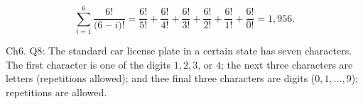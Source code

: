 \documentclass[12pt]{article}
\begin{document}
\vspace{.3cm}
\noindent
\begin{equation*}
\sum_{i=1}^{6} \frac{6!}{ \big ( 6 - i \big )! }= \frac{6!}{5!} + \frac{6!}{4!} + \frac{6!}{3!} + \frac{6!}{2!} + \frac{6!}{1!} + \frac{6!}{0!} = 1,956.
\end{equation*}

\vspace{.5cm}

\noindent
Ch6. Q8: The standard car license plate in a certain state has seven characters. The first character is one of the digits $1, 2, 3$, or $4$; the next three characters are letters (repetitions allowed); and thee final three characters are digits ($0, 1,..., 9$); repetitions are allowed. 
\end{document}
